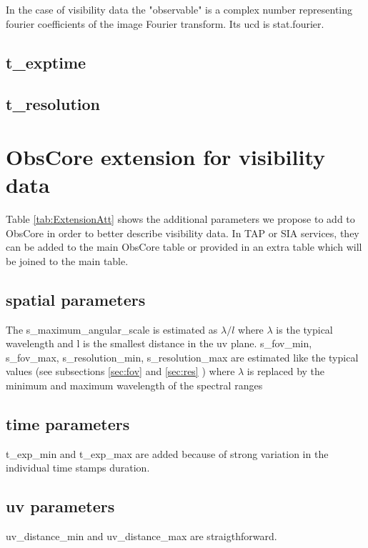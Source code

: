 \documentclass[11pt,a4paper]{ivoa}
\begin{document}
In the case of visibility data the "observable" is a complex number representing fourier coefficients of the image Fourier transform. Its ucd is stat.fourier. 

\subsection{t\_exptime}

\subsection{t\_resolution}


\section{ObsCore extension for visibility data}

Table \ref{tab:ExtensionAtt} shows the additional parameters we propose to add to ObsCore in order to better describe visibility data.
In TAP or SIA services, they can be added to the main ObsCore table or provided in an extra table which will be joined to the main table. 
\subsection{spatial parameters}

The s\_maximum\_angular\_scale is estimated as $\lambda/l$ where $\lambda$ is the typical wavelength and l is the smallest distance in the uv plane. s\_fov\_min, s\_fov\_max, s\_resolution\_min, s\_resolution\_max are estimated like the typical values (see subsections \ref{sec:fov} and \ref{sec:res} ) where $\lambda$ is replaced by the minimum and maximum wavelength of the spectral ranges

\subsection{time parameters}

t\_exp\_min and t\_exp\_max are added because of strong variation in the individual time stamps duration.

\subsection{uv parameters}
uv\_distance\_min and uv\_distance\_max are straigthforward.
\end{document}
